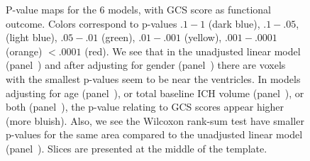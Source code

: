 \documentclass[10pt]{article}\usepackage[]{graphicx}\usepackage[]{color}
\begin{document}
\begin{figure}[H]
{ }
  \hfill
  
  \caption{P-value maps for the $6$ models, with GCS score as functional outcome. Colors correspond to p-values $.1-1$ (dark blue), $.1-.05$, (light blue), $.05-.01$ (green), $.01-.001$ (yellow),  $.001-.0001$ (orange) $< .0001$ (red).  We see that in the unadjusted linear model (panel~\protect{}) and after adjusting for gender (panel~\protect{}) there are voxels with the smallest p-values seem to be near the ventricles.  In models adjusting for age (panel~\protect{}), or total baseline ICH volume (panel~\protect{}), or both (panel~\protect{}), the p-value relating to GCS scores appear higher (more bluish).  Also, we see the Wilcoxon rank-sum test have smaller p-values for the same area compared to the unadjusted linear model (panel~\protect{}). Slices are presented at the middle of the template.  }
  \label{f:gcsmods}
\end{figure}
\end{document}
